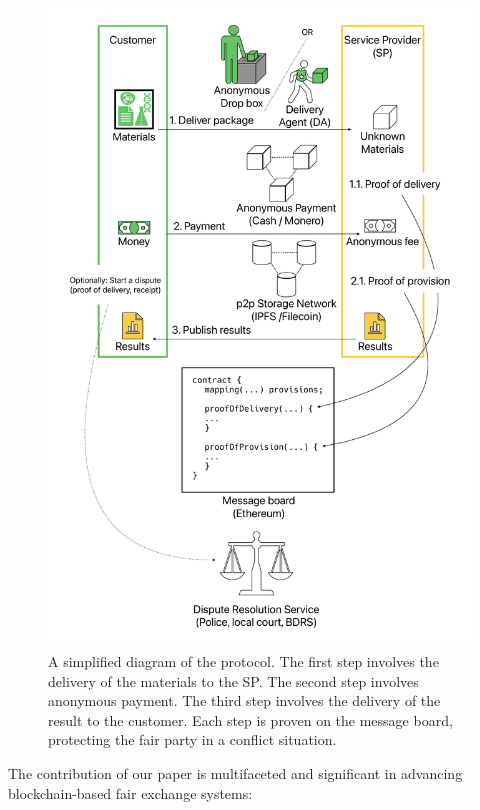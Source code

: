 \documentclass[pdftex,twocolumn,epjc3]{svjour3}
\begin{document}
\begin{figure}[h!]
\includegraphics[width=\linewidth]{protocol-overview.pdf}
\centering
\caption{A simplified diagram of the protocol. The first step involves the delivery of the materials to the SP. The second step involves anonymous payment. The third step involves the delivery of the result to the customer. Each step is proven on the message board, protecting the fair party in a conflict situation.}

\label{fig:protocol-overview}
\end{figure}

The contribution of our paper is multifaceted and significant in advancing blockchain-based fair exchange systems:
\end{document}
